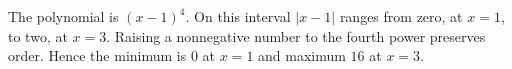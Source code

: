 The polynomial is $(x-1)^4$. On this interval $|x-1|$ ranges from zero, at $x=1$, to two, at $x=3$. Raising a nonnegative number to the fourth power preserves order. Hence the minimum is $\boxed 0$ at $x=1$ and maximum $\boxed{16}$ at $x=3$.
